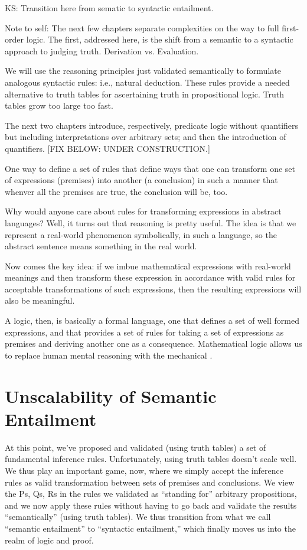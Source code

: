 \documentclass[letterpaper,10pt,english]{sphinxmanual}
\begin{document}
KS: Transition here from sematic to syntactic entailment.

Note to self: The next few chapters separate complexities on the way
to full first-order logic. The first, addressed here, is the shift
from a semantic to a syntactic approach to judging truth. Derivation
vs. Evaluation.

We will use the reasoning principles just validated semantically to
formulate analogous syntactic rules: i.e., natural deduction. These
rules provide a needed alternative to truth tables for ascertaining
truth in propositional logic. Truth tables grow too large too fast.

The next two chapters introduce, respectively, predicate logic without
quantifiers but including interpretations over arbitrary sets; and then
the introduction of quantifiers.
{[}FIX BELOW: UNDER CONSTRUCTION.{]}

One way to define a set of  rules that define ways that one
can transform one set of expressions (premises) into another (a
conclusion) in such a manner that whenver all the premises are true,
the conclusion will be, too.

Why would anyone care about rules for transforming expressions in
abstract languages? Well, it turns out that  reasoning is
pretty useful. The idea is that we represent a real-world phenomenon
symbolically, in such a language, so the abstract sentence means
something in the real world.

Now comes the key idea: if we imbue mathematical expressions with
real-world meanings and then transform these expression in accordance
with valid rules for acceptable transformations of such expressions,
then the resulting expressions will also be meaningful.

A logic, then, is basically a formal language, one that defines a set
of well formed expressions, and that provides a set of 
rules for taking a set of expressions as premises and deriving another
one as a consequence. Mathematical logic allows us to replace human
mental reasoning with the mechanical .


\section{Unscalability of Semantic Entailment}
\label{\detokenize{15-proofs:unscalability-of-semantic-entailment}}
At this point, we’ve proposed and validated (using truth tables) a set
of fundamental inference rules. Unfortunately, using truth tables
doesn’t scale well. We thus play an important game, now, where we
simply accept the inference rules as valid transformation between sets
of premises and conclusions. We view the Ps, Qs, Rs in the rules we
validated as “standing for” arbitrary propositions, and we now apply
these rules without having to go back and validate the results
“semantically” (using truth tables). We thus transition from what we
call “semantic entailment” to “syntactic entailment,” which finally
moves us into the realm of logic and proof.
\end{document}
